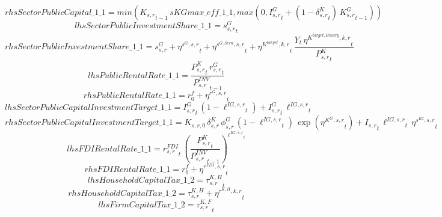 \begin{dmath*}
rhsSectorPublicCapital\_1\_1 = min({{K_{s,r}}}_{t-1}\, {sKGmax\_eff\_1\_1},max(0,{{I^G_{s,r}}}_{t}+\left(1-{{\delta^{K}_{s,r}}}_{t}\right)\, {{K^G_{s,r}}}_{t-1}))
\end{dmath*}
\begin{dmath*}
lhsSectorPublicInvestmentShare\_1\_1 = {{s^G_{s,r}}}_{t}
\end{dmath*}
\begin{dmath*}
rhsSectorPublicInvestmentShare\_1\_1 = {{s^{G}_{s,r}}}+{{\eta^{s^G,s,r}}}_{t}+{{\eta^{s^{G,Scen},s,r}}}_{t}+{{\eta^{K^{target},k,r}}}_{t}\, \frac{{Y}_{t}\, {{\eta^{K^{target,Binary},k,r}}}_{t}}{{{P^K_{s,r}}}_{t}}
\end{dmath*}
\begin{dmath*}
lhsPublicRentalRate\_1\_1 = \frac{{{P^K_{s,r}}}_{t}\, {{r^G_{s,r}}}_{t}}{{{P^{INV}_{s,r}}}_{t-1}}
\end{dmath*}
\begin{dmath*}
rhsPublicRentalRate\_1\_1 = {{r^f_0}}+{{\eta^{r^G,s,r}}}_{t}
\end{dmath*}
\begin{dmath*}
lhsSectorPublicCapitalInvestmentTarget\_1\_1 = {{I^G_{s,r}}}_{t}\, \left(1-{{\ell^{IG,s,r}}}_{t}\right)+{{I^G_{s,r}}}_{t}\, {{\ell^{IG,s,r}}}_{t}
\end{dmath*}
\begin{dmath*}
rhsSectorPublicCapitalInvestmentTarget\_1\_1 = {{K_{s,r,0}}}\, {{\delta^{K}_{s,r}}}\, {{\phi^{G}_{s,r}}}\, \left(1-{{\ell^{IG,s,r}}}_{t}\right)\, \exp\left({{\eta^{K^G,s,r}}}_{t}\right)+{{I_{s,r}}}_{t}\, {{\ell^{IG,s,r}}}_{t}\, {{\eta^{s^{IG},s,r}}}_{t}
\end{dmath*}
\begin{dmath*}
lhsFDIRentalRate\_1\_1 = {{r^{FDI}_{s,r}}}_{t}\, \left(\frac{{{P^K_{s,r}}}_{t}}{{{P^{INV}_{s,r}}}_{t-1}}\right)^{{{\ell^{IG,s,r}}}_{t}}
\end{dmath*}
\begin{dmath*}
rhsFDIRentalRate\_1\_1 = {{r^f_0}}+{{\eta^{r^{FDI},s,r}}}_{t}
\end{dmath*}
\begin{dmath*}
lhsHouseholdCapitalTax\_1\_2 = {{\tau^{K,H}_{s,r}}}_{t}
\end{dmath*}
\begin{dmath*}
rhsHouseholdCapitalTax\_1\_2 = {{\tau^{K,H}_{s,r}}}+{{\eta^{\tau^{K,H},k,r}}}_{t}
\end{dmath*}
\begin{dmath*}
lhsFirmCapitalTax\_1\_2 = {{\tau^{K,F}_{s,r}}}_{t}
\end{dmath*}
